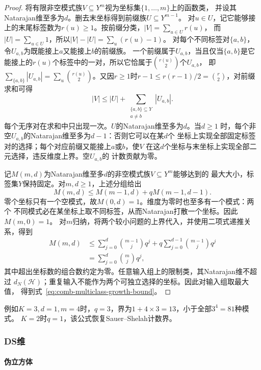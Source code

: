 \begin{proof}
将有限非空模式族\(V\subseteq Y^m\)视为坐标集\(\{1,\ldots,m\}\)上的函数类，
并设其Natarajan维至多为\(d\)。删去末坐标得到前缀族\(U\subseteq Y^{m-1}\)。
对\(u\in U\)，记它能够接上的末尾标签数为\(r(u)\geq1\)。按前缀分类，\(|V|=\sum_{u\in U}r(u)\)，
而\(|U|=\sum_{u\in U}1\)，所以\(|V|-|U|=\sum_u(r(u)-1)\)。
对每个不同标签对\(\{a,b\}\)，令\(U_{a,b}\)为既能接上\(a\)又能接上\(b\)的前缀族。
一个前缀属于\(U_{a,b}\)，当且仅当\(\{a,b\}\)是它能接上的\(r(u)\)个标签中的一对，所以它恰属于\(\binom{r(u)}2\)个\(U_{a,b}\)，
即\(\sum_{\{a,b\}}|U_{a,b}|=\sum_u\binom{r(u)}2\)。又因\(r\geq1\)时\(r-1\leq r(r-1)/2=\binom r2\)，对前缀求和可得
\[
  |V|\leq |U|+\sum_{\substack{\{a,b\}\subseteq Y\\a\neq b}}|U_{a,b}|.
\]
每个无序对在求和中只出现一次。\(U\)的Natarajan维至多为\(d\)。当\(d\geq1\)
时，每个非空\(U_{a,b}\)的Natarajan维至多为\(d-1\)：否则它可以在某\(d\)个
坐标上实现全部固定标签对的选择；每个对应前缀又能接上\(a\)或\(b\)，使\(V\)
在这\(d\)个坐标与末坐标上实现全部二元选择，违反维度上界。空\(U_{a,b}\)的
计数贡献为零。

记\(M(m,d)\)为Natarajan维至多\(d\)的非空模式族\(V\subseteq Y^m\)能够达到的
最大大小，标签集\(Y\)保持固定。对\(m,d\geq1\)，上述分组给出
\[
  M(m,d)\leq M(m-1,d)+qM(m-1,d-1).
\]
零个坐标只有一个空模式，故\(M(0,d)=1\)。维度为零时也至多有一个模式：两个
不同模式必在某坐标上取不同标签，从而Natarajan打散一个坐标。因此\(M(m,0)=1\)。
对\(m\)归纳，将两个较小问题的上界代入，并使用二项式递推关系，得到
\[
\begin{aligned}
  M(m,d)
  &\leq\sum_{j=0}^{d}\binom{m-1}{j}q^j
       +q\sum_{j=0}^{d-1}\binom{m-1}{j}q^j\\
  &=\sum_{j=0}^{d}\binom mj q^j,
\end{aligned}
\]
其中超出坐标数的组合数约定为零。任意输入组上的限制类，其Natarajan维不超过
\(d_N(\mathcal H)\)；重复输入不能作为两个可独立选择的坐标。因此对输入组取最大值，
得到式~\eqref{eq:comb-multiclass-growth-bound}。
\end{proof}

例如$K=3,d=1,m=4$时，$q=3$，界为$1+4\times3=13$，小于全部$3^4=81$种模式。
$K=2$时$q=1$，该公式恢复Sauer--Shelah计数界。

\subsubsection{DS维}
\label{sec:comb-coordinate-replacements}

\paragraph{伪立方体}

